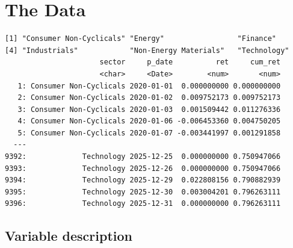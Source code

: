 \documentclass[
  12pt,
  a4paper,
]{scrbook}
\newenvironment{Shaded}{\begin{snugshade}}{\end{snugshade}}
\newcommand{\AttributeTok}[1]{\textcolor[rgb]{0.40,0.45,0.13}{#1}}
\newcommand{\CommentTok}[1]{\textcolor[rgb]{0.37,0.37,0.37}{#1}}
\newcommand{\ConstantTok}[1]{\textcolor[rgb]{0.56,0.35,0.01}{#1}}
\newcommand{\DecValTok}[1]{\textcolor[rgb]{0.68,0.00,0.00}{#1}}
\newcommand{\FunctionTok}[1]{\textcolor[rgb]{0.28,0.35,0.67}{#1}}
\newcommand{\NormalTok}[1]{\textcolor[rgb]{0.00,0.23,0.31}{#1}}
\newcommand{\OtherTok}[1]{\textcolor[rgb]{0.00,0.23,0.31}{#1}}
\newcommand{\SpecialCharTok}[1]{\textcolor[rgb]{0.37,0.37,0.37}{#1}}
\newcommand{\StringTok}[1]{\textcolor[rgb]{0.13,0.47,0.30}{#1}}
\theoremstyle{plain}
\theoremstyle{definition}
\theoremstyle{remark}
\begin{document}
\section{The Data}\label{the-data}

\begin{Shaded}
\end{Shaded}

\begin{verbatim}
[1] "Consumer Non-Cyclicals" "Energy"                 "Finance"               
[4] "Industrials"            "Non-Energy Materials"   "Technology"            
                      sector     p_date          ret     cum_ret
                      <char>     <Date>        <num>       <num>
   1: Consumer Non-Cyclicals 2020-01-01  0.000000000 0.000000000
   2: Consumer Non-Cyclicals 2020-01-02  0.009752173 0.009752173
   3: Consumer Non-Cyclicals 2020-01-03  0.001509442 0.011276336
   4: Consumer Non-Cyclicals 2020-01-06 -0.006453360 0.004750205
   5: Consumer Non-Cyclicals 2020-01-07 -0.003441997 0.001291858
  ---                                                           
9392:             Technology 2025-12-25  0.000000000 0.750947066
9393:             Technology 2025-12-26  0.000000000 0.750947066
9394:             Technology 2025-12-29  0.022808156 0.790882939
9395:             Technology 2025-12-30  0.003004201 0.796263111
9396:             Technology 2025-12-31  0.000000000 0.796263111
\end{verbatim}

\subsection{Variable description}\label{variable-description}
\end{document}
